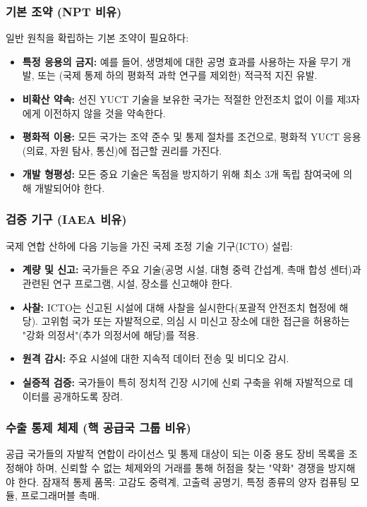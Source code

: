\documentclass[12pt,a4paper]{article}
\theoremstyle{remark}
\begin{document}
	\subsubsection{기본 조약 (NPT 비유)}
	
	일반 원칙을 확립하는 기본 조약이 필요하다:
	\begin{itemize}
		\item \textbf{특정 응용의 금지:} 예를 들어, 생명체에 대한 공명 효과를 사용하는 자율 무기 개발, 또는 (국제 통제 하의 평화적 과학 연구를 제외한) 적극적 지진 유발.
		\item \textbf{비확산 약속:} 선진 YUCT 기술을 보유한 국가는 적절한 안전조치 없이 이를 제3자에게 이전하지 않을 것을 약속한다.
		\item \textbf{평화적 이용:} 모든 국가는 조약 준수 및 통제 절차를 조건으로, 평화적 YUCT 응용(의료, 자원 탐사, 통신)에 접근할 권리를 가진다.
		\item \textbf{개발 형평성:} 모든 중요 기술은 독점을 방지하기 위해 최소 3개 독립 참여국에 의해 개발되어야 한다.
	\end{itemize}
	
	\subsubsection{검증 기구 (IAEA 비유)}
	
	국제 연합 산하에 다음 기능을 가진 국제 조정 기술 기구(ICTO) 설립:
	\begin{itemize}
		\item \textbf{계량 및 신고:} 국가들은 주요 기술(공명 시설, 대형 중력 간섭계, 촉매 합성 센터)과 관련된 연구 프로그램, 시설, 장소를 신고해야 한다.
		\item \textbf{사찰:} ICTO는 신고된 시설에 대해 사찰을 실시한다(포괄적 안전조치 협정에 해당). 고위험 국가 또는 자발적으로, 의심 시 미신고 장소에 대한 접근을 허용하는 "강화 의정서"(추가 의정서에 해당)를 적용.
		\item \textbf{원격 감시:} 주요 시설에 대한 지속적 데이터 전송 및 비디오 감시.
		\item \textbf{실증적 검증:} 국가들이 특히 정치적 긴장 시기에 신뢰 구축을 위해 자발적으로 데이터를 공개하도록 장려.
	\end{itemize}
	
	\subsubsection{수출 통제 체제 (핵 공급국 그룹 비유)}
	
	공급 국가들의 자발적 연합이 라이선스 및 통제 대상이 되는 이중 용도 장비 목록을 조정해야 하며, 신뢰할 수 없는 체제와의 거래를 통해 허점을 찾는 "약화" 경쟁을 방지해야 한다. 잠재적 통제 품목: 고감도 중력계, 고출력 공명기, 특정 종류의 양자 컴퓨팅 모듈, 프로그래머블 촉매.
	
\end{document}
